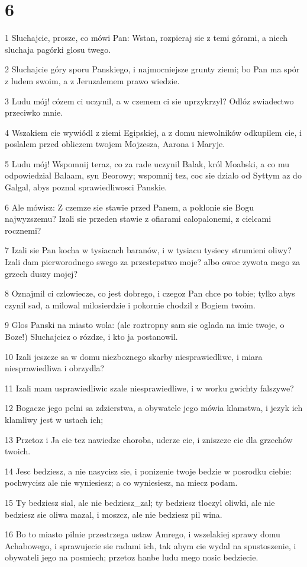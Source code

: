 \chapter{6}

\par 1 Sluchajcie, prosze, co mówi Pan: Wstan, rozpieraj sie z temi górami, a niech sluchaja pagórki glosu twego.
\par 2 Sluchajcie góry sporu Panskiego, i najmocniejsze grunty ziemi; bo Pan ma spór z ludem swoim, a z Jeruzalemem prawo wiedzie.
\par 3 Ludu mój! cózem ci uczynil, a w czemem ci sie uprzykrzyl? Odlóz swiadectwo przeciwko mnie.
\par 4 Wszakiem cie wywiódl z ziemi Egipskiej, a z domu niewolników odkupilem cie, i poslalem przed obliczem twojem Mojzesza, Aarona i Maryje.
\par 5 Ludu mój! Wspomnij teraz, co za rade uczynil Balak, król Moabski, a co mu odpowiedzial Balaam, syn Beorowy; wspomnij tez, coc sie dzialo od Syttym az do Galgal, abys poznal sprawiedliwosci Panskie.
\par 6 Ale mówisz: Z czemze sie stawie przed Panem, a poklonie sie Bogu najwyzszemu? Izali sie przeden stawie z ofiarami calopalonemi, z cielcami rocznemi?
\par 7 Izali sie Pan kocha w tysiacach baranów, i w tysiacu tysiecy strumieni oliwy? Izali dam pierworodnego swego za przestepstwo moje? albo owoc zywota mego za grzech duszy mojej?
\par 8 Oznajmil ci czlowiecze, co jest dobrego, i czegoz Pan chce po tobie; tylko abys czynil sad, a milowal milosierdzie i pokornie chodzil z Bogiem twoim.
\par 9 Glos Panski na miasto wola: (ale roztropny sam sie oglada na imie twoje, o Boze!) Sluchajciez o rózdze, i kto ja postanowil.
\par 10 Izali jeszcze sa w domu niezboznego skarby niesprawiedliwe, i miara niesprawiedliwa i obrzydla?
\par 11 Izali mam usprawiedliwic szale niesprawiedliwe, i w worku gwichty falszywe?
\par 12 Bogacze jego pelni sa zdzierstwa, a obywatele jego mówia klamstwa, i jezyk ich klamliwy jest w ustach ich;
\par 13 Przetoz i Ja cie tez nawiedze choroba, uderze cie, i zniszcze cie dla grzechów twoich.
\par 14 Jesc bedziesz, a nie nasycisz sie, i ponizenie twoje bedzie w posrodku ciebie: pochwycisz ale nie wyniesiesz; a co wyniesiesz, na miecz podam.
\par 15 Ty bedziesz sial, ale nie bedziesz_zal; ty bedziesz tloczyl oliwki, ale nie bedziesz sie oliwa mazal, i moszcz, ale nie bedziesz pil wina.
\par 16 Bo to miasto pilnie przestrzega ustaw Amrego, i wszelakiej sprawy domu Achabowego, i sprawujecie sie radami ich, tak abym cie wydal na spustoszenie, i obywateli jego na posmiech; przetoz hanbe ludu mego nosic bedziecie.

